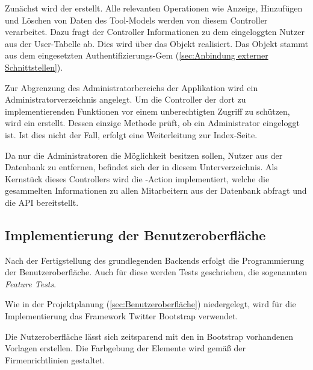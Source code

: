 Zunächst wird der  erstellt. Alle relevanten Operationen
wie Anzeige, Hinzufügen und Löschen von Daten des Tool-Models werden von diesem Controller
verarbeitet. Dazu fragt der Controller Informationen zu dem eingeloggten Nutzer aus der User-Tabelle
ab. Dies wird über das Objekt  realisiert. Das Objekt stammt aus dem
eingesetzten Authentifizierungs-Gem  (\Vgl \ref{sec:Anbindung externer Schnittstellen}).


Zur Abgrenzung des Administratorbereichs der Applikation wird ein Administratorverzeichnis angelegt.
Um die Controller der dort zu implementierenden Funktionen vor einem unberechtigten Zugriff zu schützen, wird ein
 erstellt. Dessen einzige Methode prüft, ob ein Administrator eingeloggt ist.
Ist dies nicht der Fall, erfolgt eine Weiterleitung zur Index-Seite.

Da nur die Administratoren die Möglichkeit besitzen sollen, Nutzer aus der Datenbank zu entfernen,
befindet sich der  in diesem Unterverzeichnis. Als Kernstück dieses
Controllers wird die -Action implementiert, welche die gesammelten Informationen
zu allen Mitarbeitern aus der Datenbank abfragt und die API bereitstellt.



\subsection{Implementierung der Benutzeroberfläche}
\label{sec:Implementierung der Benutzeroberfläche}
Nach der Fertigstellung des grundlegenden Backends erfolgt die Programmierung der Benutzeroberfläche.
Auch für diese werden Tests geschrieben, die sogenannten \textit{Feature Tests}.


Wie in der Projektplanung (\Vgl \ref{sec:Benutzeroberfläche}) niedergelegt, wird für die Implementierung
das Framework Twitter Bootstrap verwendet.

Die Nutzeroberfläche lässt sich zeitsparend mit den in Bootstrap vorhandenen Vorlagen erstellen. Die Farbgebung der Elemente wird gemäß der
Firmenrichtlinien gestaltet.


